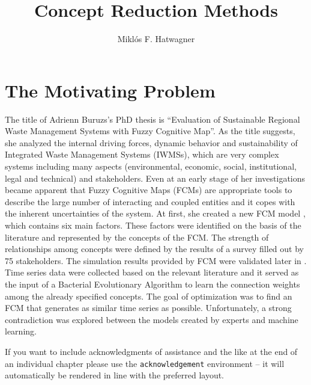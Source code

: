 \documentclass[graybox]{svmult}
\begin{document}
\title*{Concept Reduction Methods}
\author{Miklós F. Hatwagner}
%
%
\maketitle



\section{The Motivating Problem}
\label{sec:1}

The title of Adrienn Buruzs's PhD thesis \cite{buruzsphd2015} is ``Evaluation of Sustainable Regional Waste Management Systems with Fuzzy Cognitive Map''. As the title suggests, she analyzed the internal driving forces, dynamic behavior and sustainability of Integrated Waste Management Systems (IWMSs), which are very complex systems including many aspects (environmental, economic, social, institutional, legal and technical) and stakeholders. Even at an early stage of her investigations became apparent that Fuzzy Cognitive Maps (FCMs) are appropriate tools to describe the large number of interacting and coupled entities and it copes with the inherent uncertainties of the system. At first, she created a new FCM model \cite{buruzs2013developing}, which contains six main factors. These factors were identified on the basis of the literature and represented by the concepts of the FCM. The strength of relationships among concepts were defined by the results of a survey filled out by 75 stakeholders. The simulation results provided by FCM were validated later in \cite{buruzs2013advanced}. Time series data were collected based on the relevant literature and it served as the input of a Bacterial Evolutionary Algorithm to learn the connection weights among the already specified concepts. The goal of optimization was to find an FCM that generates as similar time series as possible. Unfortunately, a strong contradiction was explored between the models created by experts and machine learning. 

\begin{acknowledgement}
If you want to include acknowledgments of assistance and the like at the end of an individual chapter please use the \verb|acknowledgement| environment -- it will automatically be rendered in line with the preferred layout.
\end{acknowledgement}


\end{document}

